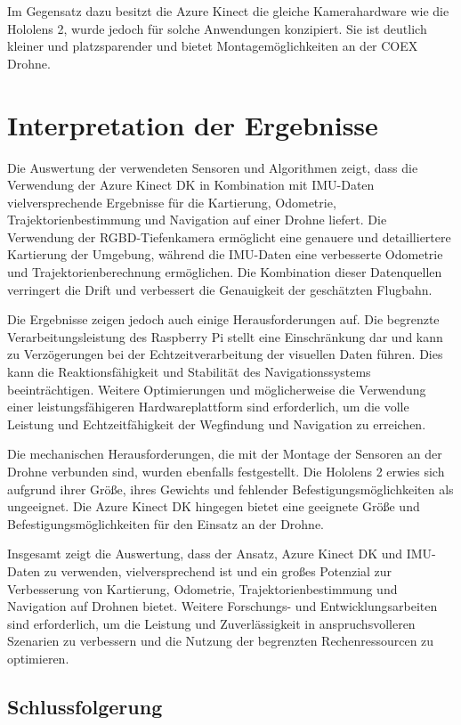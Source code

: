 Im Gegensatz dazu besitzt die Azure Kinect die gleiche Kamerahardware wie die Hololens 2, wurde jedoch für solche Anwendungen konzipiert. Sie ist deutlich kleiner und platzsparender und bietet Montagemöglichkeiten an der COEX Drohne. 

\section{Interpretation der Ergebnisse}

Die Auswertung der verwendeten Sensoren und Algorithmen zeigt, dass die Verwendung der Azure Kinect DK in Kombination mit IMU-Daten vielversprechende Ergebnisse für die Kartierung, Odometrie, Trajektorienbestimmung und Navigation auf einer Drohne liefert. Die Verwendung der RGBD-Tiefenkamera ermöglicht eine genauere und detailliertere Kartierung der Umgebung, während die IMU-Daten eine verbesserte Odometrie und Trajektorienberechnung ermöglichen. Die Kombination dieser Datenquellen verringert die Drift und verbessert die Genauigkeit der geschätzten Flugbahn.

Die Ergebnisse zeigen jedoch auch einige Herausforderungen auf. Die begrenzte Verarbeitungsleistung des Raspberry Pi stellt eine Einschränkung dar und kann zu Verzögerungen bei der Echtzeitverarbeitung der visuellen Daten führen. Dies kann die Reaktionsfähigkeit und Stabilität des Navigationssystems beeinträchtigen. Weitere Optimierungen und möglicherweise die Verwendung einer leistungsfähigeren Hardwareplattform sind erforderlich, um die volle Leistung und Echtzeitfähigkeit der Wegfindung und Navigation zu erreichen.

Die mechanischen Herausforderungen, die mit der Montage der Sensoren an der Drohne verbunden sind, wurden ebenfalls festgestellt. Die Hololens 2 erwies sich aufgrund ihrer Größe, ihres Gewichts und fehlender Befestigungsmöglichkeiten als ungeeignet. Die Azure Kinect DK hingegen bietet eine geeignete Größe und Befestigungsmöglichkeiten für den Einsatz an der Drohne.

Insgesamt zeigt die Auswertung, dass der Ansatz, Azure Kinect DK und IMU-Daten zu verwenden, vielversprechend ist und ein großes Potenzial zur Verbesserung von Kartierung, Odometrie, Trajektorienbestimmung und Navigation auf Drohnen bietet. Weitere Forschungs- und Entwicklungsarbeiten sind erforderlich, um die Leistung und Zuverlässigkeit in anspruchsvolleren Szenarien zu verbessern und die Nutzung der begrenzten Rechenressourcen zu optimieren.

\subsection{Schlussfolgerung}

